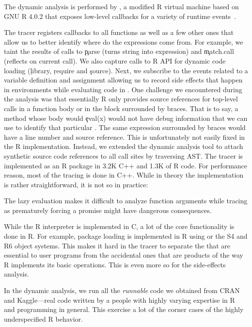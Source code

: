 \documentclass[screen,acmsmall]{acmart}
\begin{document}
The dynamic analysis is performed by \rdyntrace, a modified R virtual machine
based on GNU R 4.0.2 that exposes low-level callbacks for a variety of runtime
events~\cite{oopsla19b}.

The tracer registers callbacks to all \eval functions as well as a few other
ones that allow us to better identify where do the expressions come from. For
example, we taint the results of calls to \c{parse} (turns string into
expression) and \c{match.call} (reflects on current call). We also capture calls
to R API for dynamic code loading (\eg\xspace \c{library}, \c{require} and
\c{source}). Next, we subscribe to the events related to a variable definition
and assignment allowing us to record side effects that happen in environments
while evaluating code in \eval. One challenge we encountered during the analysis
was that essentially R only provides source references for top-level calls in a
function body or in the block surrounded by braces. That is to say, a method
whose body would \c{eval(x)} would not have debug information that we can use to
identify that particular \eval. The same expression surrounded by braces would
have a line number and source reference. This is unfortunately not easily fixed
in the R implementation. Instead, we extended the dynamic analysis tool to
attach synthetic source code references to all \eval call sites by traversing
AST. The tracer is implemented as an R package in 3.2K C++ and 1.3K of R code.
For performance reason, most of the tracing is done in C++. While in theory the
implementation is rather straightforward, it is not so in practice:
%
\begin{compactitem}[---]

\item The lazy evaluation makes it difficult to analyze function arguments
  while tracing as prematurely forcing a promise might have dangerous
  consequences.

\item While the R interpreter is implemented in C, a lot of the core
  functionality is done in R. For example, package loading is implemented in R
  using \eval or the S4 and R6 object systems. This makes it hard in the tracer
  to separate the \eval that are essential to user programs from the
  accidental ones that are products of the way R implements its basic
  operations. This is even more so for the side-effects analysis.

\item In the dynamic analysis, we run all the \emph{runnable} code we obtained
  from CRAN and Kaggle---\ie real code written by a people with highly varying
  expertise in R and programming in general. This exercise a lot of the corner
  cases of the highly underspecified R behavior.

\end{compactitem}
\end{document}
